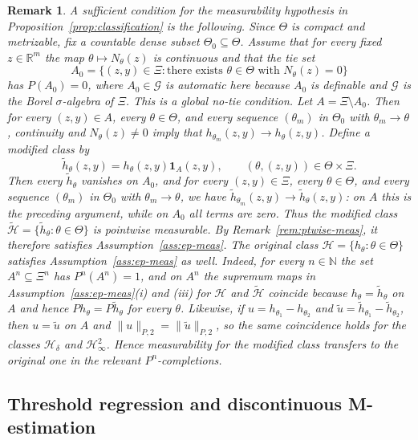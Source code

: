 \documentclass[11pt]{article}
\newtheorem{remark}[theorem]{Remark}
\begin{document}
\begin{remark}
A sufficient condition for the measurability hypothesis in
Proposition~\ref{prop:classification} is the following. Since $\Theta$
is compact and metrizable, fix a countable dense subset $\Theta_{0}\subseteq\Theta$.
Assume that for every fixed $z\in\mathbb{R}^{m}$ the map $\theta\mapsto N_{\theta}(z)$
is continuous and that the tie set
\[
A_{0}=\{(z,y)\in\Xi: \text{there exists }\theta\in\Theta\text{ with }N_{\theta}(z)=0\}
\]
has $P(A_{0})=0$, where $A_{0}\in\mathcal{G}$ is automatic here
because $A_{0}$ is definable and $\mathcal{G}$ is the Borel $\sigma$-algebra
of $\Xi$. This is a global no-tie condition. Let $A=\Xi\setminus A_{0}$. Then for every $(z,y)\in A$,
every $\theta\in\Theta$, and every sequence $(\theta_{m})$ in $\Theta_{0}$
with $\theta_{m}\to\theta$, continuity and $N_{\theta}(z)\neq0$ imply
that $h_{\theta_{m}}(z,y)\to h_{\theta}(z,y)$. Define a modified class by
\[
\tilde{h}_{\theta}(z,y)=h_{\theta}(z,y)\mathbf{1}_{A}(z,y),\qquad(\theta,(z,y))\in\Theta\times\Xi.
\]
Then every $\tilde{h}_{\theta}$ vanishes on $A_{0}$, and for every
$(z,y)\in\Xi$, every $\theta\in\Theta$, and every sequence $(\theta_{m})$
in $\Theta_{0}$ with $\theta_{m}\to\theta$, we have $\tilde{h}_{\theta_{m}}(z,y)\to\tilde{h}_{\theta}(z,y)$:
on $A$ this is the preceding argument, while on $A_{0}$ all terms are
zero. Thus the modified class $\widetilde{\mathcal{H}}=\{\tilde{h}_{\theta}:\theta\in\Theta\}$
is pointwise measurable. By Remark~\ref{rem:ptwise-meas}, it therefore
satisfies Assumption~\ref{ass:ep-meas}. The original class $\mathcal{H}=\{h_{\theta}:\theta\in\Theta\}$
satisfies Assumption~\ref{ass:ep-meas} as well. Indeed, for every
$n\in\mathbb{N}$ the set $A^{n}\subseteq\Xi^{n}$ has $P^{n}(A^{n})=1$, and on
$A^{n}$ the supremum maps in Assumption~\ref{ass:ep-meas}(i) and (iii)
for $\mathcal{H}$ and $\widetilde{\mathcal{H}}$ coincide because $h_{\theta}=\tilde{h}_{\theta}$
on $A$ and hence $Ph_{\theta}=P\tilde{h}_{\theta}$ for every $\theta$. Likewise,
if $u=h_{\theta_{1}}-h_{\theta_{2}}$ and $\tilde{u}=\tilde{h}_{\theta_{1}}-\tilde{h}_{\theta_{2}}$,
then $u=\tilde{u}$ on $A$ and $\lVert u\rVert_{P,2}=\lVert\tilde{u}\rVert_{P,2}$,
so the same coincidence holds for the classes $\mathcal{H}_{\delta}$ and
$\mathcal{H}_{\infty}^{2}$. Hence measurability for the modified class
transfers to the original one in the relevant $P^{n}$-completions.
\end{remark}

\subsection{Threshold regression and discontinuous M-estimation}
\end{document}
